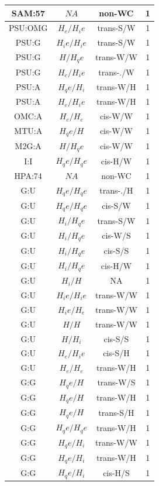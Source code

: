 \begin{center}
\begin{longtable}{c|c|c|c}
SAM:57 & $NA$ & non-WC & 1 \\  \hline
PSU:OMG & $H_e/H_ie$ & trans-S/W & 1 \\  \hline
PSU:G & $H_ie/H_ie$ & trans-S/W & 1 \\  \hline
PSU:G & $H/H_qe$ & trans-W/W & 1 \\  \hline
PSU:G & $H_e/H_ie$ & trans-./W & 1 \\  \hline
PSU:A & $H_qe/H_i$ & trans-W/H & 1 \\  \hline
PSU:A & $H_e/H_ie$ & trans-W/H & 1 \\  \hline
OMC:A & $H_e/H_e$ & cis-W/W & 1 \\  \hline
MTU:A & $H_qe/H$ & cis-W/W & 1 \\  \hline
M2G:A & $H/H_qe$ & cis-W/W & 1 \\  \hline
I:I & $H_qe/H_qe$ & cis-H/W & 1 \\  \hline
HPA:74 & $NA$ & non-WC & 1 \\  \hline
G:U & $H_qe/H_qe$ & trans-./H & 1 \\  \hline
G:U & $H_qe/H_qe$ & cis-S/W & 1 \\  \hline
G:U & $H_i/H_qe$ & trans-S/W & 1 \\  \hline
G:U & $H_i/H_qe$ & cis-W/S & 1 \\  \hline
G:U & $H_i/H_qe$ & cis-S/S & 1 \\  \hline
G:U & $H_i/H_qe$ & cis-H/W & 1 \\  \hline
G:U & $H_i/H$ & NA & 1 \\  \hline
G:U & $H_ie/H_ie$ & trans-W/W & 1 \\  \hline
G:U & $H_ie/H_e$ & trans-W/W & 1 \\  \hline
G:U & $H/H$ & trans-W/W & 1 \\  \hline
G:U & $H/H_i$ & cis-S/S & 1 \\  \hline
G:U & $H_e/H_ie$ & cis-S/H & 1 \\  \hline
G:U & $H_e/H_e$ & trans-W/H & 1 \\  \hline
G:G & $H_qe/H$ & trans-W/S & 1 \\  \hline
G:G & $H_qe/H$ & trans-W/H & 1 \\  \hline
G:G & $H_qe/H$ & trans-S/H & 1 \\  \hline
G:G & $H_qe/H_qe$ & trans-W/H & 1 \\  \hline
G:G & $H_qe/H_i$ & trans-W/W & 1 \\  \hline
G:G & $H_qe/H_i$ & trans-W/H & 1 \\  \hline
G:G & $H_qe/H_i$ & cis-H/S & 1 \\  \hline

\end{longtable}
\end{center}

